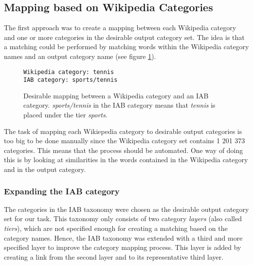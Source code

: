 \subsection{Mapping based on Wikipedia Categories}
The first approach was to create a mapping between each Wikipedia category and one or more categories in the desirable output category set. The idea is that a matching could be performed by matching words within the Wikipedia category names and an output category name (see figure \ref{fig:category_to_category_mapping}).

\begin{figure}[h]
\centering
\begin{lstlisting}
Wikipedia category: tennis
IAB category: sports/tennis
\end{lstlisting}
\caption[Example mapping between Wikipedia category and IAB category]{Desirable mapping between a Wikipedia category and an IAB category. \emph{sports/tennis} in the IAB category means that \emph{tennis} is placed under the tier \emph{sports}.}
\label{fig:category_to_category_mapping}
\end{figure}

The task of mapping each Wikiepedia category to desirable output categories is too big to be done manually since the Wikipedia category set contains 1 201 373 categories. This means that the process should be automated. One way of doing this is by looking at similarities in the words contained in the Wikipedia category and in the output category.

\subsubsection{Expanding the IAB category}
The categories in the IAB taxonomy were chosen as the desirable output category set for our task. This taxonomy  only consists of two category \emph{layers} (also called \emph{tiers}), which are not specified enough for creating a matching based on the category names. Hence, the IAB taxonomy was extended with a third and more specified layer to improve the category mapping process. This layer is added by creating a link from the second layer and to its representative third layer.


